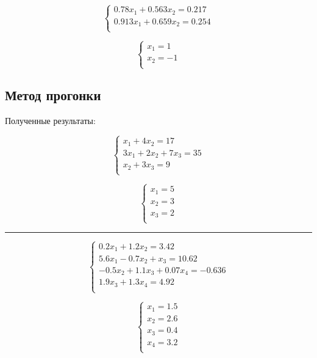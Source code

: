 \documentclass{article}
\begin{document}
\begin{multicols}{2}
\begin{displaymath}
  \left\{ \begin{array}{ll}
  0.78x_{1} + 0.563x_{2} = 0.217\\
  0.913x_{1} + 0.659x_{2} = 0.254\\
\end{array} \right.
\end{displaymath}

\begin{displaymath}
\left\{ \begin{array}{ll}
  x_{1} = 1\\
  x_{2} = -1\\
\end{array} \right.
\end{displaymath}
\end{multicols}
\subsection{Метод прогонки}
Полученные результаты:
\begin{multicols}{2}
\begin{displaymath}
  \left\{ \begin{array}{ll}
  x_{1} + 4x_{2} = 17\\
  3x_{1} + 2x_{2} + 7x_{3} = 35\\
  x_{2} + 3x_{3} = 9\\
\end{array} \right.
\end{displaymath}

\begin{displaymath}
\left\{ \begin{array}{ll}
  x_{1} = 5\\
  x_{2} = 3\\
  x_{3} = 2\\
\end{array} \right.
\end{displaymath}
\end{multicols}
\rule[1mm]{10cm}{0.1mm}
\begin{multicols}{2}
\begin{displaymath}
  \left\{ \begin{array}{ll}
  0.2x_{1} + 1.2x_{2} = 3.42\\
  5.6x_{1} - 0.7x_{2} + x_{3} = 10.62\\
  -0.5x_{2} + 1.1x_{3} + 0.07x_{4} = -0.636\\
  1.9x_{3} + 1.3x_{4} = 4.92\\
\end{array} \right.
\end{displaymath}

\begin{displaymath}
\left\{ \begin{array}{ll}
  x_{1} = 1.5\\
  x_{2} = 2.6\\
  x_{3} = 0.4\\
  x_{4} = 3.2\\
\end{array} \right.
\end{displaymath}
\end{multicols}
\end{document}
